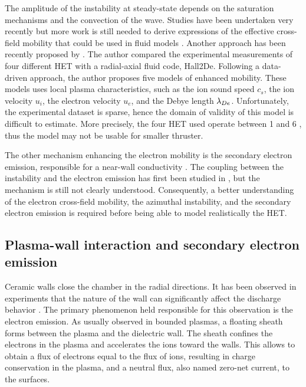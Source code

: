   The amplitude of the instability at steady-state depends on the saturation mechanisms and the convection of the wave.
  Studies have been  undertaken very recently but more work is still needed to derive expressions of the effective cross-field mobility that could be used in fluid models \citep{boeuf2017}.
  Another approach has been recently proposed by \citet{jorns2018}.
  The author compared the experimental measurements of four different \ac{HET} with a radial-axial fluid code, Hall2De.
  Following a data-driven approach, the author proposes five models of enhanced mobility.
  These models uses local plasma characteristics, such as the ion sound speed $c_s$, the ion velocity $u_i$, the electron velocity $u_e$, and the Debye length $\lambda_{De}$.
  Unfortunately, the experimental dataset is sparse, hence the domain of validity of this model is difficult to estimate.
  More precisely, the four \ac{HET} used operate between 1 and 6 \kilo\watt, thus the model may not be usable for smaller thruster.
  
  The other mechanism enhancing the electron mobility is the secondary electron emission, responsible for a near-wall conductivity \citep{morozov1972,morozov2001, barral2003a}.
  The coupling between the instability and the electron emission has first been studied in \citet{heron2013}, but the mechanism is still not clearly understood.
  Consequently, a better understanding of the electron cross-field mobility, the azimuthal instability, and the secondary electron emission is required before being able to model realistically the \ac{HET}.
  
  
\subsection{Plasma-wall interaction and secondary electron emission}

  Ceramic walls close the chamber in the radial directions.
  It has been observed in experiments that the nature of the wall can significantly affect the discharge behavior \citep{gascon2003}.
  The primary phenomenon held responsible for this observation is the electron emission.
  As usually observed in bounded plasmas, a floating sheath forms between the plasma and the dielectric wall.
  The sheath confines the electrons in the plasma and accelerates the ions toward the walls.
  This allows to obtain a flux of electrons equal to the flux of ions, resulting in charge conservation in the plasma, and a neutral flux, also named zero-net current, to the surfaces.
  
